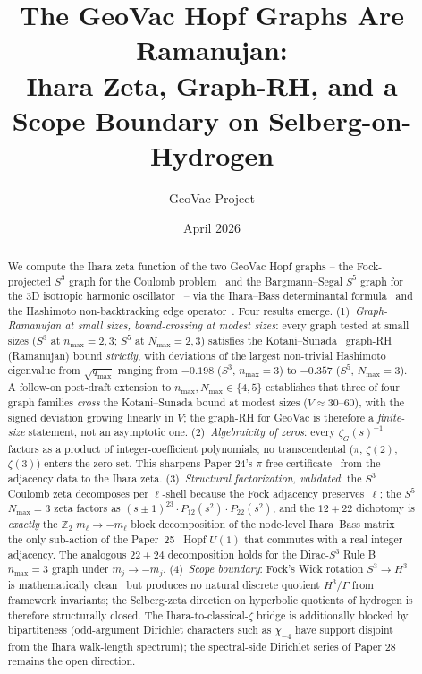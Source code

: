 \documentclass[11pt]{article}
\title{The GeoVac Hopf Graphs Are Ramanujan:\\
Ihara Zeta, Graph-RH, and a Scope Boundary on Selberg-on-Hydrogen}
\author{GeoVac Project}
\date{April 2026}
\begin{document}
\maketitle

\begin{abstract}
We compute the Ihara zeta function of the two GeoVac Hopf graphs -- the
Fock-projected $S^3$ graph for the Coulomb problem~\cite{paper7} and the
Bargmann--Segal $S^5$ graph for the 3D isotropic harmonic
oscillator~\cite{paper24} -- via the Ihara--Bass determinantal
formula~\cite{ihara1966,bass1992} and the Hashimoto non-backtracking
edge operator~\cite{hashimoto1989}.  Four results emerge.
(1)~\emph{Graph-Ramanujan at small sizes, bound-crossing at modest
sizes}: every graph tested at small sizes
($S^3$ at $n_{\max}=2,3$; $S^5$ at $N_{\max}=2,3$) satisfies the
Kotani--Sunada~\cite{kotani2000} graph-RH (Ramanujan) bound
\emph{strictly}, with deviations of the largest non-trivial Hashimoto
eigenvalue from $\sqrt{q_{\max}}$ ranging from $-0.198$ ($S^3$,
$n_{\max}=3$) to $-0.357$ ($S^5$, $N_{\max}=3$).  A follow-on
post-draft extension to $n_{\max},N_{\max}\in\{4,5\}$ establishes
that three of four graph families \emph{cross} the Kotani--Sunada
bound at modest sizes ($V\approx 30$--$60$), with the signed
deviation growing linearly in $V$; the graph-RH for GeoVac is
therefore a \emph{finite-size} statement, not an asymptotic one.
(2)~\emph{Algebraicity of zeros}:
every $\zeta_G(s)^{-1}$ factors as a product of integer-coefficient
polynomials; no transcendental ($\pi$, $\zeta(2)$, $\zeta(3)$) enters
the zero set.  This sharpens Paper 24's $\pi$-free
certificate~\cite{paper24} from the adjacency data to the Ihara zeta.
(3)~\emph{Structural factorization, validated}: the $S^3$ Coulomb zeta
decomposes per $\ell$-shell because the Fock adjacency preserves~$\ell$;
the $S^5$ $N_{\max}=3$ zeta factors as $(s\pm 1)^{23}\cdot
P_{12}(s^2)\cdot P_{22}(s^2)$, and the $12+22$ dichotomy is \emph{exactly}
the $\mathbb{Z}_2$ $m_\ell\to-m_\ell$ block decomposition of the
node-level Ihara--Bass matrix --- the only sub-action of the
Paper~25~\cite{paper25} Hopf $U(1)$ that commutes with a real integer
adjacency.  The analogous $22+24$ decomposition holds for the
Dirac-$S^3$ Rule B $n_{\max}=3$ graph under $m_j\to-m_j$.
(4)~\emph{Scope boundary}: Fock's Wick rotation $S^3\to H^3$ is
mathematically clean~\cite{bander1966} but produces no natural discrete
quotient $H^3/\Gamma$ from framework invariants; the Selberg-zeta
direction on hyperbolic quotients of hydrogen is therefore structurally
closed.  The Ihara-to-classical-$\zeta$ bridge is additionally blocked
by bipartiteness (odd-argument Dirichlet characters such as $\chi_{-4}$
have support disjoint from the Ihara walk-length spectrum); the
spectral-side Dirichlet series of Paper 28 remains the open direction.
\end{abstract}
\end{document}

